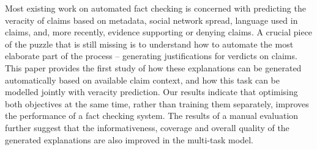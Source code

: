 Most existing work on automated fact checking is concerned with predicting the veracity of claims based on metadata, social network spread, language used in claims, and, more recently, evidence supporting or denying claims. A crucial piece of the puzzle that is still missing is to understand how to automate the most elaborate part of the process -- generating justifications for verdicts on claims. This paper provides the first study of how these explanations can be generated automatically based on available claim context, and how this task can be modelled jointly with veracity prediction. Our results indicate that optimising both objectives at the same time, rather than training them separately, improves the performance of a fact checking system. The results of a manual evaluation further suggest that the informativeness, coverage and overall quality of the generated explanations are also improved in the multi-task model.
